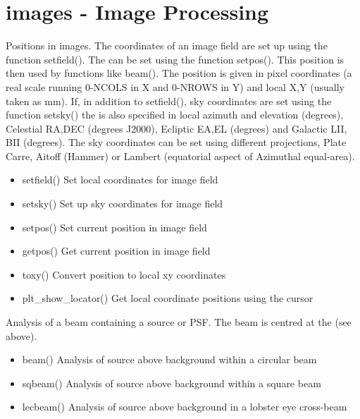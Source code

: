 \documentclass[letterpaper,10pt,english]{sphinxmanual}
\begin{document}
\chapter{images  - Image Processing}
\label{\detokenize{images:images-image-processing}}\label{\detokenize{images::doc}}
Positions in images. The coordinates of an image field are set up
using the function setfield(). The  can be set using the
function setpos(). This position is then used by functions like beam().
The position is
given in pixel coordinates (a real scale running 0-NCOLS in X and 0-NROWS in Y)
and local X,Y (usually taken as mm). If, in addition to setfield(),
sky coordinates are set using the function setsky() the  is
also specified in local
azimuth and elevation (degrees), Celestial RA,DEC (degrees J2000), Ecliptic
EA,EL (degrees) and Galactic LII, BII (degrees). The sky coordinates can be
set using different projections, Plate Carre, Aitoff (Hammer) or Lambert
(equatorial aspect of Azimuthal equal-area).
\begin{itemize}
\item {} 
setfield() Set local coordinates for image field

\item {} 
setsky() Set up sky coordinates for image field

\item {} 
setpos() Set current position in image field

\item {} 
getpos() Get current position in image field

\item {} 
toxy() Convert position to local xy coordinates

\item {} 
plt\_show\_locator() Get local coordinate positions using the cursor

\end{itemize}

Analysis of a beam containing a source or PSF. The beam is centred at the
 (see above).
\begin{itemize}
\item {} 
beam() Analysis of source above background within a circular beam

\item {} 
sqbeam() Analysis of source above background within a square beam

\item {} 
lecbeam() Analysis of source above background in a lobster eye cross-beam

\end{itemize}
\end{document}
